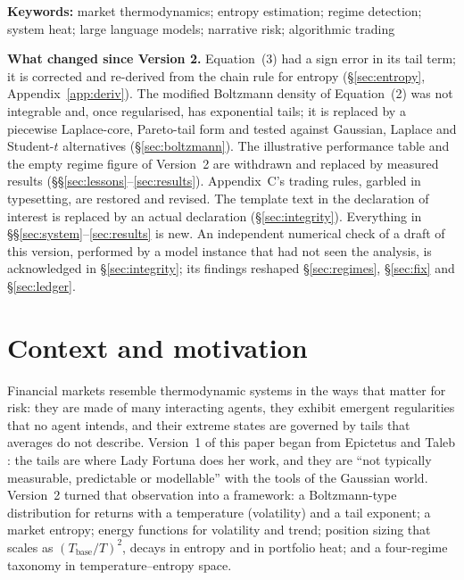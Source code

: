 \documentclass[11pt]{article}
\newcommand{\Tb}{T_{\mathrm{base}}}
\begin{document}
\begin{abstract}
entropy redefined, its thresholds calibrated, its heat made endogenous, and its empirical claims cut to what one eight-month sample supports.
\end{abstract}

\noindent\textbf{Keywords:} market thermodynamics; entropy estimation; regime detection; system heat; large language models; narrative risk; algorithmic trading

\medskip
\noindent\textbf{What changed since Version 2.} Equation~(3) had a sign error in its tail term; it is corrected and re-derived from the chain rule for entropy (\S\ref{sec:entropy}, Appendix~\ref{app:deriv}). The modified Boltzmann density of Equation~(2) was not integrable and, once regularised, has exponential tails; it is replaced by a piecewise Laplace-core, Pareto-tail form and tested against Gaussian, Laplace and Student-$t$ alternatives (\S\ref{sec:boltzmann}). The illustrative performance table and the empty regime figure of Version~2 are withdrawn and replaced by measured results (\S\S\ref{sec:lessons}--\ref{sec:results}). Appendix~C's trading rules, garbled in typesetting, are restored and revised. The template text in the declaration of interest is replaced by an actual declaration (\S\ref{sec:integrity}). Everything in \S\S\ref{sec:system}--\ref{sec:results} is new. An independent numerical check of a draft of this version, performed by a model instance that had not seen the analysis, is acknowledged in \S\ref{sec:integrity}; its findings reshaped \S\ref{sec:regimes}, \S\ref{sec:fix} and \S\ref{sec:ledger}.

\tableofcontents

\section{Context and motivation}\label{sec:intro}
Financial markets resemble thermodynamic systems in the ways that matter for risk: they are made of many interacting agents, they exhibit emergent regularities that no agent intends, and their extreme states are governed by tails that averages do not describe. Version~1 of this paper \citep{chowdhury2022} began from Epictetus and Taleb \citep{taleb}: the tails are where Lady Fortuna does her work, and they are ``not typically measurable, predictable or modellable'' with the tools of the Gaussian world. Version~2 \citep{chowdhury2025} turned that observation into a framework: a Boltzmann-type distribution for returns with a temperature (volatility) and a tail exponent; a market entropy; energy functions for volatility and trend; position sizing that scales as $(\Tb/T)^2$, decays in entropy and in portfolio heat; and a four-regime taxonomy in temperature--entropy space.
\end{document}
